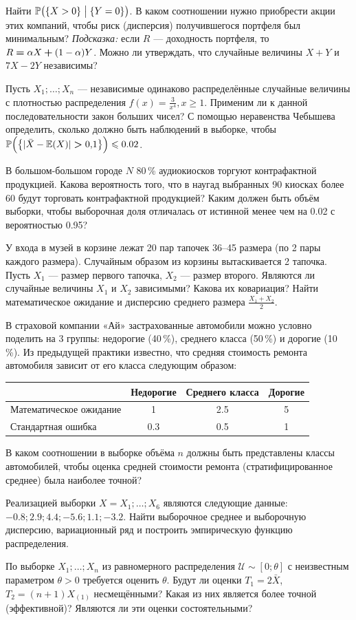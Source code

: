 \documentclass[12pt, a4paper]{article}\usepackage[]{graphicx}\usepackage[]{color}
\newenvironment{enumerate*}{
\begin{enumerate}
  \setlength{\itemsep}{0pt}
  \setlength{\parskip}{0pt}
  \setlength{\parsep}{0pt}
}{\end{enumerate}}
\begin{document}
\begin{enumerate*}
    Найти $\P\bigl( \{X>0\} \bigm| \{Y=0\}\bigr)$. В каком соотношении нужно приобрести акции этих компаний, чтобы риск (дисперсия) получившегося портфеля был минимальным? \emph{Подсказка:} если $R$ — доходность портфеля, то $R\hm=\alpha X\hm+(1-\alpha)Y$. Можно ли утверждать, что случайные величины $X+Y$ и $7X-2Y$ независимы?
\item Пусть $X_1;\ldots;X_n$ — независимые одинаково распределённые случайные величины с плотностью распределения $f(x)=\frac{3}{x^4}, x\geqslant 1$. Применим ли к данной последовательности закон больших чисел? С помощью неравенства Чебышева определить, сколько должно быть наблюдений в выборке, чтобы $\P\Bigl( \big\{ |\bar X -\E(X)|\hm>0{,}1\big\} \Big)\leqslant 0.02$.
\item В большом-большом городе $N$ 80\,\% аудиокиосков торгуют контрафактной продукцией. Какова вероятность того, что  в наугад выбранных 90 киосках более 60 будут торговать контрафактной  продукцией? Каким должен быть объём выборки, чтобы выборочная доля отличалась от истинной менее чем на 0.02 с вероятностью 0.95?
\item У входа в музей в корзине лежат 20 пар тапочек 36--45 размера (по 2 пары каждого размера). Случайным образом из корзины вытаскивается 2 тапочка. Пусть $X_1$ — размер первого тапочка, $X_2$ — размер второго. Являются ли случайные величины $X_1$ и $X_2$ зависимыми? Какова их ковариация? Найти математическое ожидание и дисперсию среднего размера $\frac{X_1+X_2}{2}$.
\item В страховой компании «Ай» застрахованные автомобили можно условно поделить на 3 группы: недорогие (40\,\%), среднего класса (50\,\%) и дорогие (10\,\%). Из предыдущей практики известно, что средняя стоимость ремонта автомобиля зависит от его класса следующим образом:
    \begin{center}
    \begin{tabular}{|l|c|c|c|}
    \hline
    & Недорогие & Среднего класса & Дорогие \\ \hline
    Математическое ожидание & 1 & 2.5 & 5 \\ \hline
    Стандартная ошибка & 0.3 & 0.5 & 1 \\ \hline
    \end{tabular}
    \end{center}
    В каком соотношении в выборке объёма $n$ должны быть представлены классы автомобилей, чтобы оценка средней стоимости ремонта (стратифицированное среднее) была наиболее точной?
\item Реализацией выборки $X=X_1;\ldots;X_6$ являются следующие данные: $-0.8; 2.9; 4.4; -5.6; 1.1; -3.2$. Найти выборочное среднее и выборочную дисперсию, вариационный ряд и построить эмпирическую функцию распределения.
\item По выборке $X_1;\ldots;X_n$ из равномерного распределения $\mathcal{U}\sim[0;\theta]$ с неизвестным параметром $\theta >0$ требуется оценить $\theta$. Будут ли оценки $T_1=2\bar{X}$, $T_2=(n+1)X_{(1)}$ несмещёнными? Какая из них является более точной (эффективной)? Являются ли эти оценки состоятельными?
\end{enumerate*}
\end{document}

